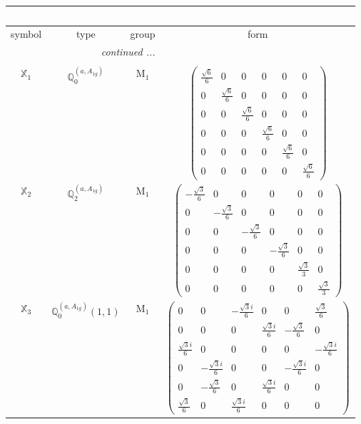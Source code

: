 \documentclass[fleqn,10pt,landscape]{article}
\begin{document}
\begin{itemize}
\begin{center}
\begin{longtable}{c|c|c|c}
\multicolumn{3}{l}{\tablename\ \thetable{}} \\
 \hline \hline
symbol & type & group & form \\ \hline \endhead

 \hline \hline
\multicolumn{3}{r}{\footnotesize\it continued ...} \\ \endfoot

 \hline \hline
\multicolumn{3}{r}{} \\ \endlastfoot

$ \mathbb{X}_{1} $ & $\mathbb{Q}_{0}^{(a,A_{1g})}$ & M$_{1}$ & $\begin{pmatrix} \frac{\sqrt{6}}{6} & 0 & 0 & 0 & 0 & 0 \\ 0 & \frac{\sqrt{6}}{6} & 0 & 0 & 0 & 0 \\ 0 & 0 & \frac{\sqrt{6}}{6} & 0 & 0 & 0 \\ 0 & 0 & 0 & \frac{\sqrt{6}}{6} & 0 & 0 \\ 0 & 0 & 0 & 0 & \frac{\sqrt{6}}{6} & 0 \\ 0 & 0 & 0 & 0 & 0 & \frac{\sqrt{6}}{6} \end{pmatrix}$ \\
$ \mathbb{X}_{2} $ & $\mathbb{Q}_{2}^{(a,A_{1g})}$ & M$_{1}$ & $\begin{pmatrix} - \frac{\sqrt{3}}{6} & 0 & 0 & 0 & 0 & 0 \\ 0 & - \frac{\sqrt{3}}{6} & 0 & 0 & 0 & 0 \\ 0 & 0 & - \frac{\sqrt{3}}{6} & 0 & 0 & 0 \\ 0 & 0 & 0 & - \frac{\sqrt{3}}{6} & 0 & 0 \\ 0 & 0 & 0 & 0 & \frac{\sqrt{3}}{3} & 0 \\ 0 & 0 & 0 & 0 & 0 & \frac{\sqrt{3}}{3} \end{pmatrix}$ \\
$ \mathbb{X}_{3} $ & $\mathbb{Q}_{0}^{(a,A_{1g})}(1,1)$ & M$_{1}$ & $\begin{pmatrix} 0 & 0 & - \frac{\sqrt{3} i}{6} & 0 & 0 & \frac{\sqrt{3}}{6} \\ 0 & 0 & 0 & \frac{\sqrt{3} i}{6} & - \frac{\sqrt{3}}{6} & 0 \\ \frac{\sqrt{3} i}{6} & 0 & 0 & 0 & 0 & - \frac{\sqrt{3} i}{6} \\ 0 & - \frac{\sqrt{3} i}{6} & 0 & 0 & - \frac{\sqrt{3} i}{6} & 0 \\ 0 & - \frac{\sqrt{3}}{6} & 0 & \frac{\sqrt{3} i}{6} & 0 & 0 \\ \frac{\sqrt{3}}{6} & 0 & \frac{\sqrt{3} i}{6} & 0 & 0 & 0 \end{pmatrix}$ \\

\end{longtable}
\end{center}
\end{itemize}
\end{document}
